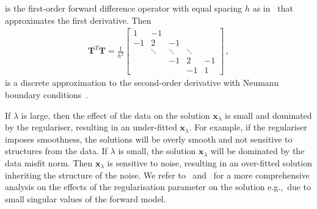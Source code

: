 is the first-order forward difference operator with equal spacing $h$ as in~\cite{tan2016LecNot} that approximates the first derivative.
Then 
\begin{align}
	\bm{T}^T\bm{T} = \frac{1}{h^2}
	\begin{bmatrix}
		1 & -1 & & &  \\
		-1 & 2& -1 & &   \\
		& \ddots & \ddots & \ddots &\\ 
		& & -1 & 2 & -1  \\
		& & & -1 & 1 
	\end{bmatrix} \, ,
\label{eq:LaplRegTheo}
\end{align}
is a discrete approximation to the second-order derivative with Neumann boundary conditions~\cite{wang2015graphs}.

If $\lambda$ is large, then the effect of the data on the solution $\bm{x}_{\lambda}$ is small and dominated by the regulariser, resulting in an under-fitted $\bm{x}_{\lambda}$.
For example, if the regulariser imposes smoothness, the solutions will be overly smooth and not sensitive to structures from the data.
If $\lambda$ is small, the solution $\bm{x}_{\lambda}$ will be dominated by the data misfit norm.
Then $\bm{x}_{\lambda}$ is sensitive to noise, resulting in an over-fitted solution inheriting the structure of the noise.
We refer to~\cite{hansen1989GSVD} and~\cite{tan2016LecNot} for a more comprehensive analysis on the effects of the regularisation parameter on the solution e.g.,~due to small singular values of the forward model.



